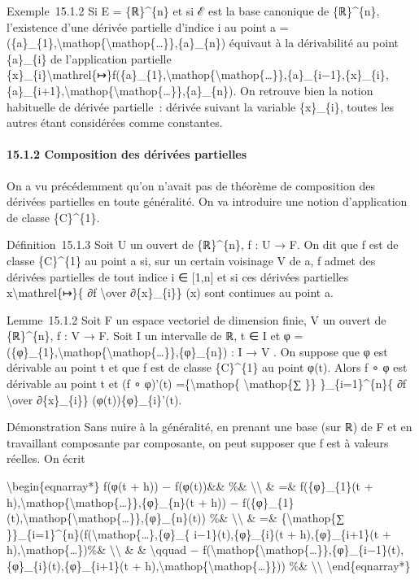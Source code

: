 \documentclass[]{article}
\begin{document}
Exemple~15.1.2 Si E = \{ℝ\}\^{}\{n\} et si ℰ est la base canonique de
\{ℝ\}\^{}\{n\}, l'existence d'une dérivée partielle d'indice i au point
a =
(\{a\}\_\{1\},\textbackslash{}mathop\{\textbackslash{}mathop\{\ldots{}\}\},\{a\}\_\{n\})
équivaut à la dérivabilité au point \{a\}\_\{i\} de l'application
partielle
\{x\}\_\{i\}\textbackslash{}mathrel\{↦\}f(\{a\}\_\{1\},\textbackslash{}mathop\{\textbackslash{}mathop\{\ldots{}\}\},\{a\}\_\{i−1\},\{x\}\_\{i\},\{a\}\_\{i+1\},\textbackslash{}mathop\{\textbackslash{}mathop\{\ldots{}\}\},\{a\}\_\{n\}).
On retrouve bien la notion habituelle de dérivée partielle~: dérivée
suivant la variable \{x\}\_\{i\}, toutes les autres étant considérées
comme constantes.

\paragraph{15.1.2 Composition des dérivées partielles}

On a vu précédemment qu'on n'avait pas de théorème de composition des
dérivées partielles en toute généralité. On va introduire une notion
d'application de classe \{C\}\^{}\{1\}.

Définition~15.1.3 Soit U un ouvert de \{ℝ\}\^{}\{n\}, f : U → F. On dit
que f est de classe \{C\}\^{}\{1\} au point a si, sur un certain
voisinage V de a, f admet des dérivées partielles de tout indice i ∈
{[}1,n{]} et si ces dérivées partielles x\textbackslash{}mathrel\{↦\}\{
∂f \textbackslash{}over ∂\{x\}\_\{i\}\} (x) sont continues au point a.

Lemme~15.1.2 Soit F un espace vectoriel de dimension finie, V un ouvert
de \{ℝ\}\^{}\{n\}, f : V → F. Soit I un intervalle de ℝ, t ∈ I et φ =
(\{φ\}\_\{1\},\textbackslash{}mathop\{\textbackslash{}mathop\{\ldots{}\}\},\{φ\}\_\{n\})
: I → V . On suppose que φ est dérivable au point t et que f est de
classe \{C\}\^{}\{1\} au point φ(t). Alors f ∘ φ est dérivable au point
t et (f ∘ φ)'(t) =\{\textbackslash{}mathop\{ \textbackslash{}mathop\{∑
\}\} \}\_\{i=1\}\^{}\{n\}\{ ∂f \textbackslash{}over ∂\{x\}\_\{i\}\}
(φ(t))\{φ\}\_\{i\}'(t).

Démonstration Sans nuire à la généralité, en prenant une base (sur ℝ) de
F et en travaillant composante par composante, on peut supposer que f
est à valeurs réelles. On écrit

\textbackslash{}begin\{eqnarray*\} f(φ(t + h)) − f(φ(t))\&\& \%\&
\textbackslash{}\textbackslash{} \& =\& f(\{φ\}\_\{1\}(t +
h),\textbackslash{}mathop\{\textbackslash{}mathop\{\ldots{}\}\},\{φ\}\_\{n\}(t
+ h)) −
f(\{φ\}\_\{1\}(t),\textbackslash{}mathop\{\textbackslash{}mathop\{\ldots{}\}\},\{φ\}\_\{n\}(t))
\%\& \textbackslash{}\textbackslash{} \& =\& \{\textbackslash{}mathop\{∑
\}\}\_\{i=1\}\^{}\{n\}(f(\textbackslash{}mathop\{\ldots{}\},\{φ\}\_\{
i−1\}(t),\{φ\}\_\{i\}(t + h),\{φ\}\_\{i+1\}(t +
h),\textbackslash{}mathop\{\ldots{}\})\%\&
\textbackslash{}\textbackslash{} \& \& \textbackslash{}qquad −
f(\textbackslash{}mathop\{\textbackslash{}mathop\{\ldots{}\}\},\{φ\}\_\{i−1\}(t),\{φ\}\_\{i\}(t),\{φ\}\_\{i+1\}(t
+ h),\textbackslash{}mathop\{\textbackslash{}mathop\{\ldots{}\}\})) \%\&
\textbackslash{}\textbackslash{} \textbackslash{}end\{eqnarray*\}
\end{document}
